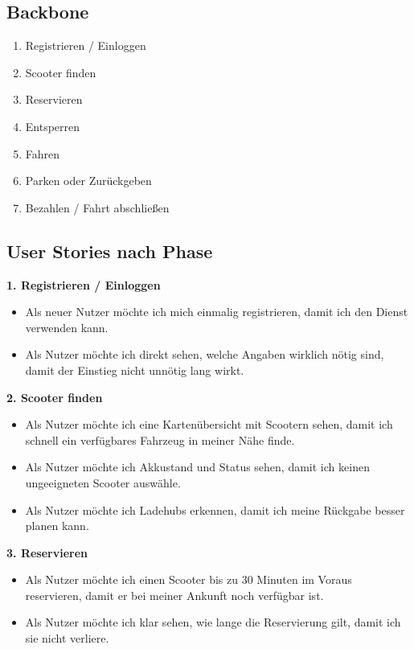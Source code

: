\documentclass[11pt,a4paper]{article}
\begin{document}
\subsection{Backbone}
\begin{enumerate}
  \item Registrieren / Einloggen
  \item Scooter finden
  \item Reservieren
  \item Entsperren
  \item Fahren
  \item Parken oder Zur\"uckgeben
  \item Bezahlen / Fahrt abschlie{\ss}en
\end{enumerate}

\subsection{User Stories nach Phase}

\textbf{1. Registrieren / Einloggen}
\begin{itemize}
  \item Als neuer Nutzer m\"ochte ich mich einmalig registrieren, damit ich den Dienst verwenden kann.
  \item Als Nutzer m\"ochte ich direkt sehen, welche Angaben wirklich n\"otig sind, damit der Einstieg nicht unn\"otig lang wirkt.
\end{itemize}

\textbf{2. Scooter finden}
\begin{itemize}
  \item Als Nutzer m\"ochte ich eine Karten\"ubersicht mit Scootern sehen, damit ich schnell ein verf\"ugbares Fahrzeug in meiner N\"ahe finde.
  \item Als Nutzer m\"ochte ich Akkustand und Status sehen, damit ich keinen ungeeigneten Scooter ausw\"ahle.
  \item Als Nutzer m\"ochte ich Ladehubs erkennen, damit ich meine R\"uckgabe besser planen kann.
\end{itemize}

\textbf{3. Reservieren}
\begin{itemize}
  \item Als Nutzer m\"ochte ich einen Scooter bis zu 30 Minuten im Voraus reservieren, damit er bei meiner Ankunft noch verf\"ugbar ist.
  \item Als Nutzer m\"ochte ich klar sehen, wie lange die Reservierung gilt, damit ich sie nicht verliere.
\end{itemize}
\end{document}
